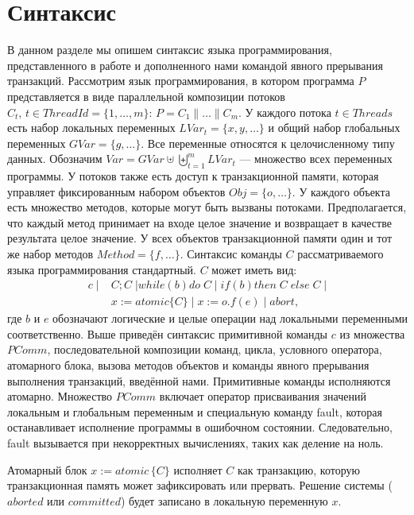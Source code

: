 \section{Синтаксис}
В данном разделе мы опишем синтаксис языка программирования, представленного в работе \cite{tms_article} и дополненного нами командой явного прерывания транзакций. Рассмотрим язык программирования, в котором программа $P$ представляется в виде параллельной композиции потоков  $C_t,\, t \in ThreadId=\{1, \ldots, m \}$: $P = C_1 \parallel \ldots \parallel C_m$. У каждого потока $t \in Threads$ есть набор локальных переменных $LVar_t = \{x,y, \ldots \}$ и общий набор глобальных переменных $GVar = \{g, \ldots \}$. Все переменные относятся к целочисленному типу данных. Обозначим  $Var = GVar \uplus \biguplus_{t = 1}^m LVar_{t}$ --- множество всех переменных программы. У потоков также есть доступ к транзакционной памяти, которая управляет фиксированным набором объектов $Obj = \{o, \ldots \}$. У каждого объекта есть множество методов, которые могут быть вызваны потоками. Предполагается, что каждый метод принимает на входе целое значение и возвращает в качестве результата целое значение. У всех объектов транзакционной памяти один и тот же набор методов $Method = \{f, \ldots \}$. Синтаксис команды $C$ рассматриваемого языка программирования стандартный. $C$ может иметь вид: 
\begin{align*}
c \; | \; &C;C \; | while \left (b \right) do \; C \; | \; if \left (b \right) then \; C \; else \; C \; | \\
&x := atomic\{C\} \; | \; x := o.f(e) \; | \; abort,
\end{align*}
где $b$ и $e$ обозначают логические и целые операции над локальными переменными соответственно. Выше приведён синтаксис примитивной команды $c$ из множества $PComm$, последовательной композиции команд, цикла, условного оператора, атомарного блока, вызова методов объектов и команды явного прерывания выполнения транзакций, введённой нами. Примитивные команды исполняются атомарно. Множество $PComm$ включает оператор присваивания значений локальным и глобальным переменным и специальную команду fault, которая останавливает исполнение программы в ошибочном состоянии. Следовательно, fault вызывается при некорректных вычислениях, таких как деление на ноль.

Атомарный блок $x := atomic \, \{C\}$ исполняет $C$ как транзакцию, которую транзакционная память может зафиксировать или прервать. Решение системы ($aborted$ или $committed$) будет записано в локальную переменную $x$. 


